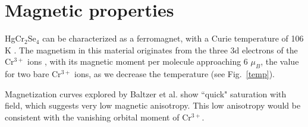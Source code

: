 \documentclass[preprint,pre,floats,aps,amsmath,amssymb]{revtex4}
\begin{document}

\section{Magnetic properties}

HgCr$_2$Se$_4$ can be characterized as a ferromagnet, with a Curie temperature of 106 K \cite{baltzer}. The magnetism in this material originates from the three 3d electrons of the Cr$^{3+}$ ions \cite{selmi}, with its magnetic moment per molecule approaching 6 $\mu_B$, the value for two bare Cr$^{3+}$ ions, as we decrease the temperature (see Fig.~\ref{temp}).

Magnetization curves explored by Baltzer et al. \cite{baltzer} show ``quick" saturation with field, which suggests very low magnetic anisotropy. This low anisotropy would be consistent with the vanishing orbital moment of Cr$^{3+}$\cite{baltzer}.
\end{document}
